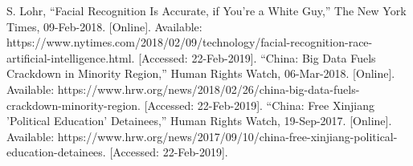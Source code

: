 \documentclass[letterpaper, 10 pt, conference]{ieeeconf}  %
\begin{document}
\begin{thebibliography}{99}
S. Lohr, “Facial Recognition Is Accurate, if You're a White Guy,” The New York Times, 09-Feb-2018. [Online]. Available: https://www.nytimes.com/2018/02/09/technology/facial-recognition-race-artificial-intelligence.html. [Accessed: 22-Feb-2019].
“China: Big Data Fuels Crackdown in Minority Region,” Human Rights Watch, 06-Mar-2018. [Online]. Available: https://www.hrw.org/news/2018/02/26/china-big-data-fuels-crackdown-minority-region. [Accessed: 22-Feb-2019].
“China: Free Xinjiang 'Political Education' Detainees,” Human Rights Watch, 19-Sep-2017. [Online]. Available: https://www.hrw.org/news/2017/09/10/china-free-xinjiang-political-education-detainees. [Accessed: 22-Feb-2019].



\end{thebibliography}
\end{document}
